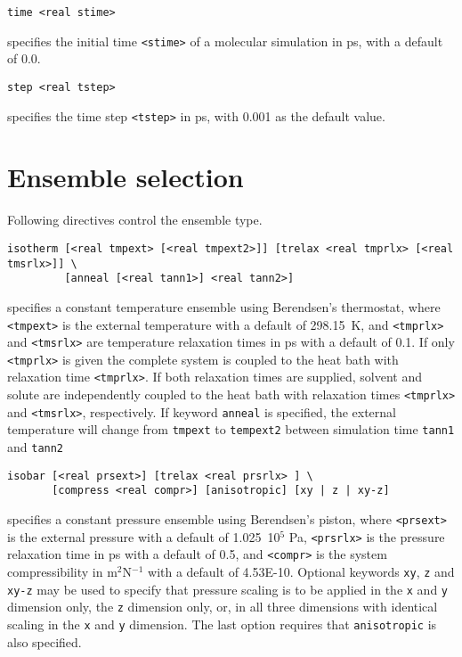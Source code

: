 \begin{description}
\item
\begin{verbatim}
time <real stime>
\end{verbatim}
specifies the initial time \verb+<stime>+ of a molecular simulation in ps,
with a default of 0.0.

\item
\begin{verbatim}
step <real tstep>
\end{verbatim}
specifies the time step \verb+<tstep>+ in ps, with 0.001 as the default value.
\end{description}

\section{Ensemble selection}
Following directives control the ensemble type.

\begin{description}

\item
\begin{verbatim}
isotherm [<real tmpext> [<real tmpext2>]] [trelax <real tmprlx> [<real tmsrlx>]] \
         [anneal [<real tann1>] <real tann2>]
\end{verbatim}
specifies a constant temperature ensemble using Berendsen's thermostat,
where \verb+<tmpext>+ is the external temperature with a default of 298.15~K,
and \verb+<tmprlx>+ and \verb+<tmsrlx>+ are temperature relaxation times in ps 
with a default of 0.1. If only \verb+<tmprlx>+ is given the complete system
is coupled to the heat bath with relaxation time \verb+<tmprlx>+. If both
relaxation times are supplied, solvent and solute are independently coupled
to the heat bath with relaxation times \verb+<tmprlx>+ and \verb+<tmsrlx>+,
respectively. If keyword \verb+anneal+ is specified, the external temperature 
will change from \verb+tmpext+ to \verb+tempext2+ between simulation time
\verb+tann1+ and \verb+tann2+ 

\item
\begin{verbatim}
isobar [<real prsext>] [trelax <real prsrlx> ] \
       [compress <real compr>] [anisotropic] [xy | z | xy-z]
\end{verbatim}
specifies a constant pressure ensemble using Berendsen's piston,
where \verb+<prsext>+ is the external pressure with a default of 1.025~10$^5$ Pa,
\verb+<prsrlx>+ is the pressure relaxation time in ps with a default of 0.5, and
\verb+<compr>+ is the system compressibility in m$^2$N$^{-1}$ with a
default of 4.53E-10. Optional keywords \verb+xy+, \verb+z+ and \verb+xy-z+ 
may be used to specify that pressure scaling is to be applied in 
the \verb+x+ and \verb+y+ dimension only, the \verb+z+ dimension only, or, 
in all three dimensions with identical scaling in the \verb+x+ and \verb+y+ 
dimension. The last option requires that \verb+anisotropic+ is also specified.

\end{description}

